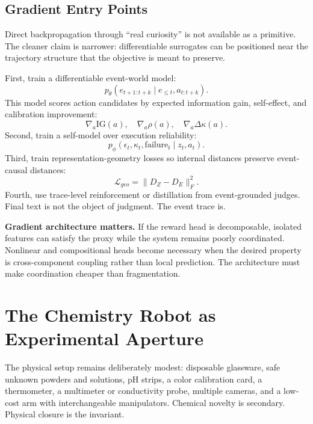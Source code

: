 \documentclass[11pt]{article}
\newcommand{\IG}{\mathrm{IG}}
\begin{document}
\subsection{Gradient Entry Points}

Direct backpropagation through ``real curiosity'' is not available as a primitive. The cleaner claim is narrower: differentiable surrogates can be positioned near the trajectory structure that the objective is meant to preserve.

First, train a differentiable event-world model:
\begin{equation}
  p_\theta(e_{t+1:t+k}\mid e_{\le t},a_{t:t+k}).
\end{equation}
This model scores action candidates by expected information gain, self-effect, and calibration improvement:
\begin{equation}
  \nabla_a \IG(a),\quad \nabla_a\rho(a),\quad \nabla_a\Delta\kappa(a).
\end{equation}
Second, train a self-model over execution reliability:
\begin{equation}
  p_\phi(\epsilon_t,\kappa_t,\mathrm{failure}_t\mid z_t,a_t).
\end{equation}
Third, train representation-geometry losses so internal distances preserve event-causal distances:
\begin{equation}
  \mathcal{L}_{geo}=\|D_Z-D_E\|_F^2.
\end{equation}
Fourth, use trace-level reinforcement or distillation from event-grounded judges. Final text is not the object of judgment. The event trace is.

\begin{warnbox}
\textbf{Gradient architecture matters.} If the reward head is decomposable, isolated features can satisfy the proxy while the system remains poorly coordinated. Nonlinear and compositional heads become necessary when the desired property is cross-component coupling rather than local prediction. The architecture must make coordination cheaper than fragmentation.
\end{warnbox}

\section{The Chemistry Robot as Experimental Aperture}

The physical setup remains deliberately modest: disposable glassware, safe unknown powders and solutions, pH strips, a color calibration card, a thermometer, a multimeter or conductivity probe, multiple cameras, and a low-cost arm with interchangeable manipulators. Chemical novelty is secondary. Physical closure is the invariant.
\end{document}
